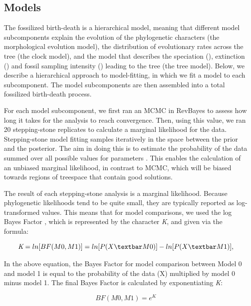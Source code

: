 \documentclass{article}
\begin{document}
\subsection{Models}
The fossilized birth-death is a hierarchical model, meaning that different model subcomponents explain the evolution of the phylogenetic characters (the morphological evolution model), the distribution of evolutionary rates across the tree (the clock model), and the model that describes the speciation (\textit{\textlambda}), extinction (\textit{\textmu}) and fossil sampling intensity (\textit{\textpsi}) leading to the tree (the tree model). 
Below, we describe a hierarchical approach to model-fitting, in which we fit a model to each subcomponent.
The model subcomponents are then assembled into a total fossilized birth-death process.

For each model subcomponent, we first ran an MCMC in RevBayes to assess how long it takes for the analysis to reach convergence. 
Then, using this value, we ran 20 stepping-stone replicates to calculate a marginal likelihood for the data.
Stepping-stone model fitting samples iteratively in the space between the prior and the posterior.
The aim in doing this is to estimate the probability of the data summed over all possible values for parameters  \citep{Xie2011}. 
This enables the calculation of an unbiased marginal likelihood, in contrast to MCMC, which will be biased towards regions of treespace that contain good solutions. 

The result of each stepping-stone analysis is a marginal likelihood.
Because phylogenetic likelihoods tend to be quite small, they are typically reported as log-transformed values.
This means that for model comparisons, we used the log Bayes Factor \citep{Kass1995}, which is represented by the character \textit{K}, and given via the formula:

\begin{center}
  \[  \textit{K}=ln[BF(M0,M1)]=ln[P(X \textbar M0)] - ln[P(X \textbar M1)],  \]
\end{center}    
    
In the above equation, the Bayes Factor for model comparison between Model 0 and model 1 is equal to the probability of the data (X) multiplied by model 0 minus model 1. The final Bayes Factor is calculated by exponentiating \textit{K}:

\begin{center}
  \[  BF(M0,M1)=\textit{e}^\textit{K} \]
\end{center}
\end{document}
